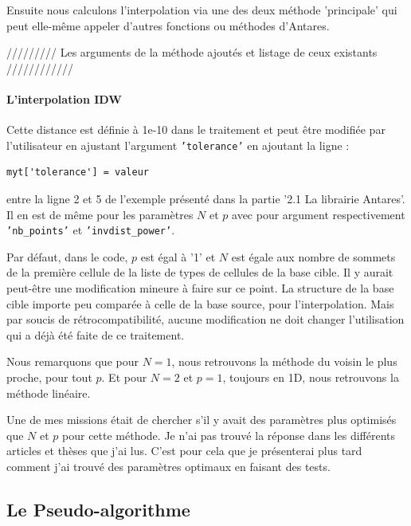 Ensuite nous calculons l'interpolation via une des deux méthode 'principale' qui peut elle-même appeler d'autres fonctions ou méthodes d'Antares. %


///////// Les arguments de la méthode ajoutés et listage de ceux existants //////////// \label{arguments}


\label{implementation_IDW}\paragraph{L'interpolation IDW}

Cette distance est définie à 1e-10 dans le traitement et peut être modifiée par l'utilisateur en ajustant l'argument \texttt{'tolerance'} en ajoutant la ligne :
\begin{lstlisting}[]
    myt['tolerance'] = valeur
\end{lstlisting}
entre la ligne 2 et 5 de l'exemple présenté dans la partie '2.1 La librairie Antares'.
Il en est de même pour les paramètres \(N\) et \(p\) avec pour argument respectivement \texttt{'nb\_points'} et \texttt{'invdist\_power'}.

Par défaut, dans le code, \(p\) est égal à '1' et \(N\) est égale aux nombre de sommets de la première cellule de la liste de types de cellules de la base cible. Il y aurait peut-être une modification mineure à faire sur ce point. La structure de la base cible importe peu comparée à celle de la base source, pour l'interpolation. Mais par soucis de rétrocompatibilité, aucune modification ne doit changer l'utilisation qui a déjà été faite de ce traitement. %

Nous remarquons que pour \( N = 1 \), nous retrouvons la méthode du voisin le plus proche, pour tout \( p \).
Et pour \( N = 2 \) et \( p = 1 \), toujours en 1D, nous retrouvons la méthode linéaire.

Une de mes missions était de chercher s'il y avait des paramètres plus optimisés que \(N\) et \(p\) pour cette méthode. Je n'ai pas trouvé la réponse dans les différents articles\cite{idw-arcgis} et thèses que j'ai lus. C'est pour cela que je présenterai plus tard comment j'ai trouvé des paramètres optimaux en faisant des tests.



\subsection{Le Pseudo-algorithme}



